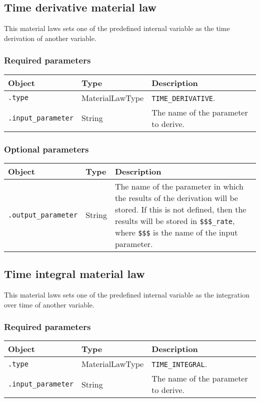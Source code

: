 \documentclass[10pt]{article}
\begin{document}
\subsection{Time derivative material law}

This material laws sets one of the predefined internal variable as the time derivation of another variable.

\subsubsection*{Required parameters}

\begin{tabularx}{\textwidth}{llX}
\hline 
Object & Type & Description \\ 
\hline 
\verb+.type+ & MaterialLawType & \verb+TIME_DERIVATIVE+. \\ 
\verb+.input_parameter+ & String & The name of the parameter to derive.\\
\hline 
\end{tabularx}

\subsubsection*{Optional parameters}

\begin{tabularx}{\textwidth}{llX}
\hline 
Object & Type & Description \\ 
\hline 
\verb+.output_parameter+ & String & The name of the parameter in which the results of the derivation will be stored. If this is not defined, then the results will be stored in \verb+$$$_rate+, where \verb+$$$+ is the name of the input parameter.\\
\hline 
\end{tabularx}

\subsection{Time integral material law}

This material laws sets one of the predefined internal variable as the integration over time of another variable.

\subsubsection*{Required parameters}

\begin{tabularx}{\textwidth}{llX}
\hline 
Object & Type & Description \\ 
\hline 
\verb+.type+ & MaterialLawType & \verb+TIME_INTEGRAL+. \\ 
\verb+.input_parameter+ & String & The name of the parameter to derive.\\
\hline 
\end{tabularx}
\end{document}
